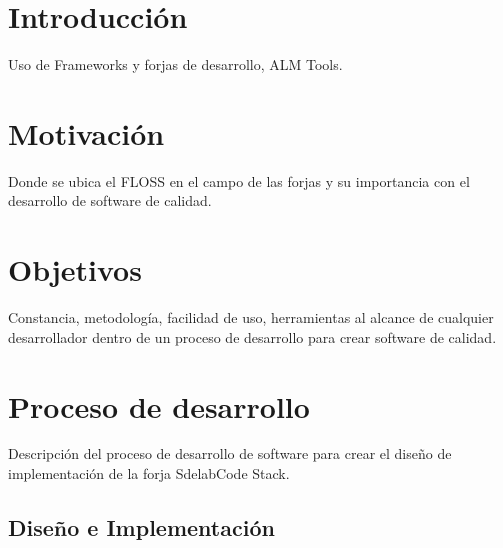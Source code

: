 \documentclass[11pt]{scrartcl}
\begin{document}
\tableofcontents  %

\newpage

\listoffigures  %

\newpage

\listoftables %

\newpage


\section{Introducci\'on}
\label{sec:introduccion}

\par Uso de Frameworks y forjas de desarrollo, ALM Tools.


\section{Motivaci\'on}
\label{sec:motivacion}

\par Donde se ubica el FLOSS en el campo de las forjas y su importancia con el desarrollo de software de calidad.


\section{Objetivos}
\label{sec:objetivos}

\par Constancia, metodolog\'ia, facilidad de uso, herramientas al alcance de cualquier desarrollador dentro de un proceso de desarrollo para crear software de calidad.


\section{Proceso de desarrollo}
\label{sec:procesodesarrollo}

\par Descripci\'on del proceso de desarrollo de software para crear el diseño de implementaci\'on de la forja SdelabCode Stack.

\subsection{Dise\~no e Implementaci\'on}
\label{sub:diseno}
\end{document}
